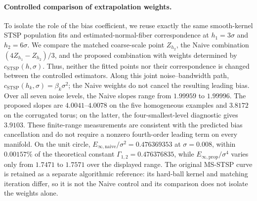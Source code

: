 \paragraph{Controlled comparison of extrapolation weights.}
To isolate the role of the bias coefficient, we reuse exactly the same smooth-kernel STSP population fits and estimated-normal-fiber correspondence at $h_1=3\sigma$ and $h_2=6\sigma$. We compare the matched coarse-scale point $Z_{h_2}$, the Naive combination $(4Z_{h_1}-Z_{h_2})/3$, and the proposed combination with weights determined by $c_{\mathrm{STSP}}(h,\sigma)$. Thus, neither the fitted points nor their correspondence is changed between the controlled estimators. Along this joint noise--bandwidth path, $c_{\mathrm{STSP}}(h_k,\sigma)=\beta_k\sigma^2$; the Naive weights do not cancel the resulting leading bias. Over all seven noise levels, the Naive slopes range from $1.99959$ to $1.99996$. The proposed slopes are $4.0041$--$4.0078$ on the five homogeneous examples and $3.8172$ on the corrugated torus; on the latter, the four-smallest-level diagnostic gives $3.9103$. These finite-range measurements are consistent with the predicted bias cancellation and do not require a nonzero fourth-order leading term on every manifold. On the unit circle, $E_{\infty,\mathrm{naive}}/\sigma^2=0.476369353$ at $\sigma=0.008$, within $0.00157\%$ of the theoretical constant $\Gamma_{1,2}=0.476376835$, while $E_{\infty,\mathrm{prop}}/\sigma^4$ varies only from $1.7471$ to $1.7571$ over the displayed range. The original MS-STSP curve is retained as a separate algorithmic reference: its hard-ball kernel and matching iteration differ, so it is not the Naive control and its comparison does not isolate the weights alone.
